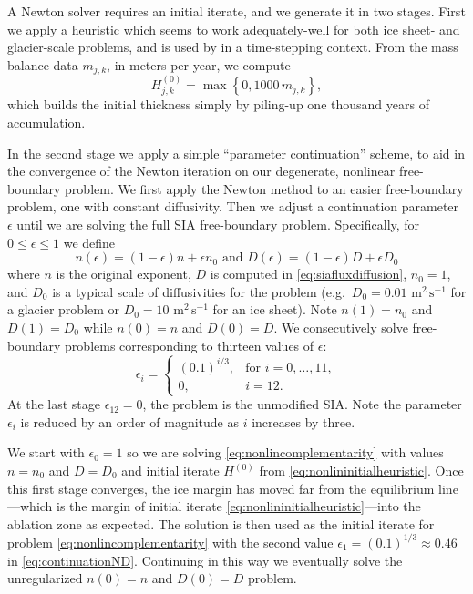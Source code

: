 \documentclass[review,letterpaper]{igs}
\newcommand\eps{\epsilon}
\begin{document}
A Newton solver requires an initial iterate, and we generate it in two stages.  First we apply a heuristic which seems to work adequately-well for both ice sheet- and glacier-scale problems, and is used by \cite{JouvetGraeser2013} in a time-stepping context.  From the mass balance data $m_{j,k}$, in meters per year, we compute
\begin{equation}
H_{j,k}^{(0)} = \max\left\{0,1000\,m_{j,k}\right\},  \label{eq:nonlininitialheuristic}
\end{equation}
which builds the initial thickness simply by piling-up one thousand years of accumulation.

In the second stage we apply a simple ``parameter continuation'' scheme, to aid in the convergence of the Newton iteration on our degenerate, nonlinear free-boundary problem.  We first apply the Newton method to an easier free-boundary problem, one with constant diffusivity.  Then we adjust a continuation parameter $\eps$ until we are solving the full SIA free-boundary problem.  Specifically, for $0 \le \eps \le 1$ we define
\begin{equation}
n(\eps) = (1\!-\eps) n + \eps n_0 \text{ and } D(\eps) = (1\!-\eps) D + \eps D_0  \label{eq:continuationND}
\end{equation}
where $n$ is the original exponent, $D$ is computed in \eqref{eq:siafluxdiffusion}, $n_0=1$, and $D_0$ is a typical scale of diffusivities for the problem (e.g.~$D_0=0.01$ $\text{m}^2\,\text{s}^{-1}$ for a glacier problem or $D_0=10$ $\text{m}^2\,\text{s}^{-1}$ for an ice sheet).  Note $n(1)=n_0$ and $D(1)=D_0$ while $n(0)=n$ and $D(0)=D$.  We consecutively solve free-boundary problems corresponding to thirteen values of $\eps$:
\begin{equation}
\eps_i = \begin{cases}
           (0.1)^{i/3}, & \text{for } i=0,\dots,11, \\
           0, & i=12.
         \end{cases}  \label{eq:continuationseq}
\end{equation}
At the last stage $\eps_{12}=0$, the problem is the unmodified SIA.  Note the parameter $\eps_i$ is reduced by an order of magnitude as $i$ increases by three.

We start with $\eps_0=1$ so we are solving \eqref{eq:nonlincomplementarity} with values $n=n_0$ and $D=D_0$ and initial iterate $H^{(0)}$ from \eqref{eq:nonlininitialheuristic}.  Once this first stage converges, the ice margin has moved far from the equilibrium line---which is the margin of initial iterate \eqref{eq:nonlininitialheuristic}---into the ablation zone as expected.  The solution is then used as the initial iterate for problem \eqref{eq:nonlincomplementarity} with the second value $\eps_1=(0.1)^{1/3}\approx 0.46$ in \eqref{eq:continuationND}.  Continuing in this way we eventually solve the unregularized $n(0)=n$ and $D(0)=D$ problem.
\end{document}
